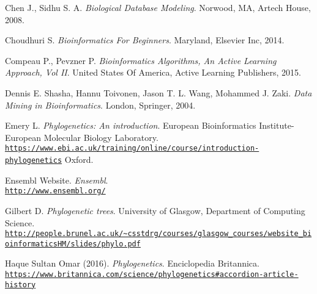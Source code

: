 \documentclass[twoside,openright,titlepage,fleqn,
,	headinclude,12pt,a4paper,BCOR5mm,footinclude,table]{scrbook}
\newcommand{\?}{'\-\nobreak\hspace{0pt}}
\begin{document}
\begin{thebibliography}{50}
Chen J., Sidhu S. A.\newline
\textit{Biological Database Modeling}.\newline
Norwood, MA, Artech House, 2008.

Choudhuri S. \newline
\textit{Bioinformatics For Beginners}. \newline
Maryland, Elsevier Inc, 2014.

Compeau P., Pevzner P. \newline
\textit{Bioinformatics Algorithms, An Active Learning Approach, Vol II}. \newline
United States Of America, Active Learning Publishers, 2015.

Dennis E. Shasha, Hannu Toivonen, Jason T. L. Wang, Mohammed J. Zaki. \newline
\textit{Data Mining in Bioinformatics}.\newline
London, Springer, 2004.

Emery L.\newline
\textit{Phylogenetics: An introduction}.\newline
European Bioinformatics Institute-European Molecular Biology Laboratory.
\\\texttt{\url{https://www.ebi.ac.uk/training/online/course/introduction-phylogenetics}}\newline
Oxford.

Ensembl Website.\newline
\textit{Ensembl}.
\\\texttt{\url{http://www.ensembl.org/}}

Gilbert D. \newline
\textit{Phylogenetic trees}.\newline
University of Glasgow, Department of Computing Science.
\\\texttt{\url{http://people.brunel.ac.uk/~csstdrg/courses/glasgow_courses/website_bioinformaticsHM/slides/phylo.pdf}}

Haque Sultan Omar (2016).\newline
\textit{Phylogenetics}.\newline
Enciclopedia Britannica.
\\\texttt{\url{https://www.britannica.com/science/phylogenetics\#accordion-article-history}}


\end{thebibliography}
\end{document}
